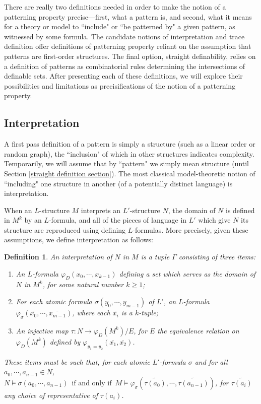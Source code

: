 \documentclass[10pt,a4paper]{amsart}
\newcommand{\IFF}{\enspace\text{if and only if}\enspace}
\newcommand{\vphi}{\varphi}
\newtheorem{definition}{Definition}
\begin{document}
There are really two definitions needed in order to make the notion of a patterning property precise---first, what a pattern is, and second, what it means for a theory or model to ``include" or ``be patterned by" a given pattern, as witnessed by some formula. The candidate notions of interpretation and trace definition offer definitions of patterning property reliant on the assumption that patterns are first-order structures. The final option, straight definability, relies on a definition of patterns as combinatorial rules determining the intersections of definable sets. After presenting each of these definitions, we will explore their possibilities and limitations as precisifications of the notion of a patterning property.



\subsection{Interpretation}\label{interpretation section}

A first pass definition of a pattern is simply a structure (such as a linear order or random graph), the ``inclusion" of which in other structures indicates complexity. Temporarily, we will assume that by ``pattern" we simply mean structure (until Section \ref{straight definition section}). The most classical model-theoretic notion of ``including" one structure in another (of a potentially distinct language) is interpretation. 

When an $L$-structure $M$ interprets an $L'$-structure $N$, the domain of $N$ is defined in $M^k$ by an $L$-formula, and all of the pieces of language in $L'$ which give $N$ its structure are reproduced using defining $L$-formulas. More precisely, given these assumptions, we define interpretation as follows:

\begin{definition}\label{interpretation definition}
    An \textit{interpretation} of $N$ in $M$ is a tuple $\Gamma$ consisting of three items: 
    \begin{enumerate}
        \item An $L$-formula $\vphi_D(x_0,\dotsm, x_{k-1})$ defining a set which serves as the domain of $N$ in $M^k$, for some natural number $k\geq 1$; 

        \item For each atomic formula $\sigma(y_0,\dotsm, y_{m-1})$ of $L'$, an $L$-formula $\vphi_\sigma(\overline{x_0},\dotsm, \overline{x_{m-1}})$, where each $\overline{x_i}$ is a $k$-tuple;

        \item An injective map $\tau\colon N \to \vphi_D(M^k)/E$, for $E$ the equivalence relation on $\vphi_D(M^k)$ defined by $\varphi_{y_1=y_2}(\overline{x_1}, \overline{x_2})$. 
    \end{enumerate} 

These items must be such that, for each atomic $L'$-formula $\sigma$ and for all $a_0,\dotsm, a_{n-1}\in N$, $N\models \sigma(a_0,\dotsm, a_{n-1}) \IFF M\models \vphi_\sigma(\tilde{\tau(a_0)},\dotsm,\tilde{\tau(a_{n-1})})$, for $\tilde{\tau(a_{i})}$ any choice of representative of $\tau(a_{i})$.
\end{definition} 
\end{document}
